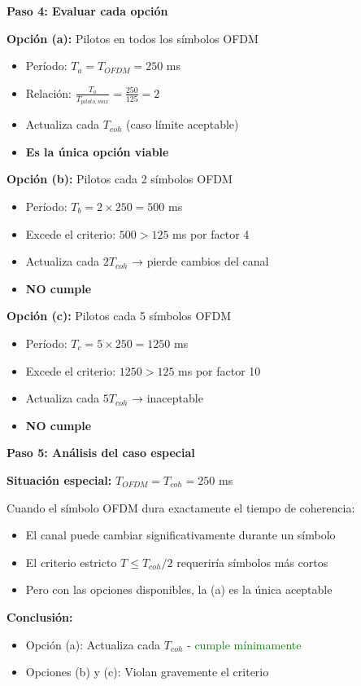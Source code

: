 \documentclass[11pt,a4paper]{article}
\begin{document}
\textbf{Paso 4: Evaluar cada opción}

\textbf{Opción (a):} Pilotos en todos los símbolos OFDM
\begin{itemize}
    \item Período: $T_a = T_{OFDM} = 250$ ms
    \item Relación: $\frac{T_a}{T_{piloto,max}} = \frac{250}{125} = 2$
    \item Actualiza cada $T_{coh}$ (caso límite aceptable)
    \item \textbf{Es la única opción viable}
\end{itemize}

\textbf{Opción (b):} Pilotos cada 2 símbolos OFDM
\begin{itemize}
    \item Período: $T_b = 2 \times 250 = 500$ ms
    \item Excede el criterio: $500 > 125$ ms por factor 4
    \item Actualiza cada $2T_{coh}$ → pierde cambios del canal
    \item \textbf{NO cumple}
\end{itemize}

\textbf{Opción (c):} Pilotos cada 5 símbolos OFDM
\begin{itemize}
    \item Período: $T_c = 5 \times 250 = 1250$ ms
    \item Excede el criterio: $1250 > 125$ ms por factor 10
    \item Actualiza cada $5T_{coh}$ → inaceptable
    \item \textbf{NO cumple}
\end{itemize}

\textbf{Paso 5: Análisis del caso especial}

\textbf{Situación especial:} $T_{OFDM} = T_{coh} = 250$ ms

Cuando el símbolo OFDM dura exactamente el tiempo de coherencia:
\begin{itemize}
    \item El canal puede cambiar significativamente durante un símbolo
    \item El criterio estricto $T \leq T_{coh}/2$ requeriría símbolos más cortos
    \item Pero con las opciones disponibles, la (a) es la única aceptable
\end{itemize}

\textbf{Conclusión:}
\begin{itemize}
    \item Opción (a): Actualiza cada $T_{coh}$ - \textcolor{green}{cumple mínimamente}
    \item Opciones (b) y (c): Violan gravemente el criterio
\end{itemize}
\end{document}
